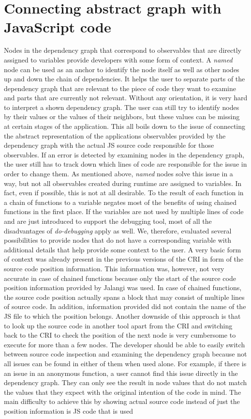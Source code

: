 \section{Connecting abstract graph with JavaScript code}
Nodes in the dependency graph that correspond to observables that are directly assigned to variables provide developers with some form of context. A \emph{named} node can be used as an anchor to identify the node itself as well as other nodes up and down the chain of dependencies. It helps the user to separate parts of the dependency graph that are relevant to the piece of code they want to examine and parts that are currently not relevant. Without any orientation, it is very hard to interpret a shown dependency graph. The user can still try to identify nodes by their values or the values of their neighbors, but these values can be missing at certain stages of the application. This all boils down to the issue of connecting the abstract representation of the applications observables provided by the dependency graph with the actual JS source code responsible for those observables. If an error is detected by examining nodes in the dependency graph, the user still has to track down which lines of code are responsible for the issue in order to change them. As mentioned above, \emph{named} nodes solve this issue in a way, but not all observables created during runtime are assigned to variables. In fact, even if possible, this is not at all desirable. To the result of each function in a chain of functions to a variable negates most of the benefits of using chained functions in the first place. If the variables are not used by multiple lines of code and are just introduced to support the debugging tool, most of all the disadvantages of \emph{do-debugging} apply as well. We, therefore, evaluated several possibilities to provide nodes that do not have a corresponding variable with additional details that help provide some context to the user. A very basic form of context was already present in the previous versions of the CRI in form of the source code position information. This information was, however, not very accurate in case of chained functions because only the start of the source code position information provided by Jalangi was used. In case of chained functions, the source code position actually spans a block that may consist of multiple lines of source code. In addition, information provided did not contain the name of the JS file to which the position belongs. Another downside of this approach is that to look up the source code in another tool apart from the CRI and switching back to the CRI to check the position of the next node is very cumbersome to execute for more than a few nodes. The developer should be able to easily switch between source code inspection and examining the dependency graph because not all issues can be found in either of them when used alone. For example, if there is an issue in an anonymous function, a user cannot find this issue directly in the dependency graph. They can only see the result in node values that do not match the values that they expect with the original intention of the code in mind. The main difficulty to achieve this by showing actual source code instead of just the position information is JS code that is used 